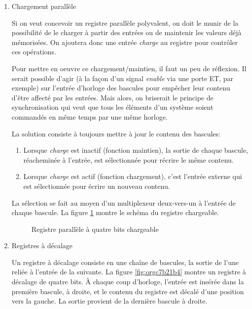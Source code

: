 \documentclass[letter, oneside]{book}
\begin{document}
\begin{enumerate}
\item Chargement parallèle
\label{sec:org5dbd4e8}

Si on veut concevoir un registre parallèle polyvalent, on doit le
munir de la possibilité de le charger à partir des entrées ou de
maintenir les valeurs déjà mémorisées. On ajoutera donc une entrée
\emph{charge} au registre pour contrôler ces opérations.

Pour mettre en oeuvre ce chargement/maintien, il faut un peu de
réflexion. Il serait possible d'agir (à la façon d'un signal \emph{enable}
via une porte ET, par exemple) sur l'entrée d'horloge des bascules pour
empêcher leur contenu d'être affecté par les entrées. Mais alors, on
briserait le principe de synchronisation qui veut que tous les
éléments d'un système soient commandés en même temps par une même
horloge.

La solution consiste à toujours mettre à jour le contenu des bascules: 

\begin{enumerate}
\item Lorsque \emph{charge} est inactif (fonction maintien), la sortie de
chaque bascule, réacheminée à l'entrée, est sélectionnée pour
récrire le même contenu.
\item Lorsque \emph{charge} est actif (fonction chargement), c'est l'entrée
externe qui est sélectionnée pour écrire un nouveau contenu.
\end{enumerate}

La sélection se fait au moyen d'un multiplexeur deux-vers-un à
l'entrée de chaque bascule. La figure \ref{fig:org2d83a25} montre le schéma
du registre chargeable.

\begin{figure}[htbp]
\centering

\caption{\label{fig:org2d83a25}Registre parallèle à quatre bits chargeable}
\end{figure}

\item Registres à décalage
\label{sec:org6aa80df}

Un registre à décalage consiste en une chaîne de bascules, la sortie
de l'une reliée à l'entrée de la suivante. La figure \ref{fig:orgc7b21b4} montre
un registre à décalage de quatre bits. À chaque coup d'horloge,
l'entrée est insérée dans la première bascule, à droite, et le contenu
du registre est décalé d'une position vers la gauche. La sortie
provient de la dernière bascule à droite.


\end{enumerate}
\end{document}
